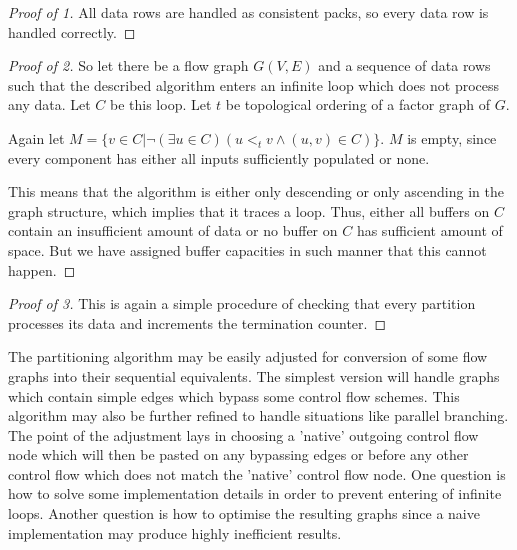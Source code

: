 \begin{proof}[Proof of 1]
  All data rows are handled as consistent packs, so every data row is handled correctly.
\end{proof}
\begin{proof}[Proof of 2] So let there be a flow graph $G(V,E)$ and a sequence of data rows such that the described algorithm enters an infinite loop which does not process any data. Let $C$ be this loop. Let $t$ be topological ordering of a factor graph of $G$. 
  \item Again let $M = \{v \in C | \neg (\exists u \in C)( u <_t v \land (u,v) \in C)\}$. $M$ is empty, since every component has either all inputs sufficiently populated or none. 
    
    This means that the algorithm is either only descending or only ascending in the graph structure, which implies that it traces a loop. Thus, either all buffers on $C$ contain an insufficient amount of data or no buffer on $C$ has sufficient amount of space. But we have assigned buffer capacities in such manner that this cannot happen.
\end{proof}
\begin{proof}[Proof of 3]
  This is again a simple procedure of checking that every partition processes its data and increments the termination counter.
\end{proof}
\myendclaim

\begin{rem} 
  The partitioning algorithm may be easily adjusted for conversion of some flow graphs into their sequential equivalents. The simplest version will handle graphs which contain simple edges which bypass some control flow schemes. This algorithm may also be further refined to handle situations like parallel branching. The point of the adjustment lays in choosing a 'native' outgoing control flow node which will then be pasted on any bypassing edges or before any other control flow which does not match the 'native' control flow node. One question is how to solve some implementation details in order to prevent entering of infinite loops. Another question is how to optimise the resulting graphs since a naive implementation may produce highly inefficient results. 
\end{rem}



